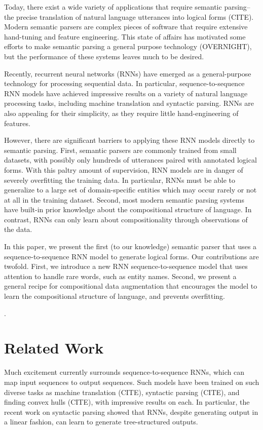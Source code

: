 \documentclass[11pt,letterpaper]{article}
\begin{document}
Today, there exist a wide variety of applications that 
require semantic parsing--the precise translation of
natural language utterances into logical forms (CITE).
Modern semantic parsers are complex pieces of software
that require extensive hand-tuning and feature engineering.
This state of affairs has motivated some efforts
to make semantic parsing a general purpose technology (OVERNIGHT),
but the performance of these systems leaves much to be desired.

Recently, recurrent neural networks (RNNs) have emerged
as a general-purpose technology for processing sequential data.
In particular, sequence-to-sequence RNN models
have achieved impressive results on a variety of natural language processing
tasks, including machine translation and syntactic parsing.
RNNs are also appealing for their simplicity, as they require 
little hand-engineering of features.

However, there are significant barriers to applying these 
RNN models directly to semantic parsing.
First, semantic parsers are commonly trained from small datasets,
with possibly only hundreds of utterances paired with annotated logical forms.
With this paltry amount of supervision,
RNN models are in danger of severely overfitting the training data.
In particular, RNNs must be able to generalize to a large set of
domain-specific entities which may occur rarely or not at all
in the training dataset.
Second, most modern semantic parsing systems have built-in
prior knowledge about the compositional structure of language.
In contrast, RNNs can only learn about compositionality
through observations of the data.

In this paper, we present the first (to our knowledge)
semantic parser that uses a sequence-to-sequence RNN model to generate
logical forms.  
Our contributions are twofold.
First, we introduce a new RNN sequence-to-sequence model that uses 
attention to handle rare words, such as entity names.
Second, we present a general recipe
for compositional data augmentation that encourages 
the model to learn the compositional structure of language, 
and prevents overfitting.

\cite{liang2013lambdadcs}.

\section{Related Work}
Much excitement currently surrounds sequence-to-sequence RNNs,
which can map input sequences to output sequences.
Such models have been trained on such diverse tasks as
machine translation (CITE), syntactic parsing (CITE), and 
finding convex hulls (CITE), with impressive results on each.
In particular, the recent work on syntactic parsing showed that
RNNs, despite generating output in a linear fashion, can 
learn to generate tree-structured outputs.
\end{document}
